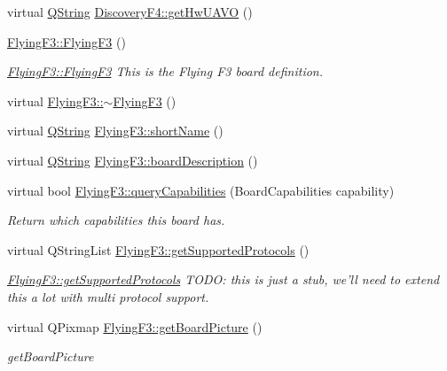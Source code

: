 \begin{DoxyCompactItemize}
virtual \hyperlink{group___u_a_v_objects_plugin_gab9d252f49c333c94a72f97ce3105a32d}{Q\-String} \hyperlink{group___boards___stm_gad4fb3147a8ceb8b1106048d7b44d92e9}{Discovery\-F4\-::get\-Hw\-U\-A\-V\-O} ()
\item 
\hyperlink{group___boards___stm_ga9b44241cce2e1f0737c9fef2eace273b}{Flying\-F3\-::\-Flying\-F3} ()
\begin{DoxyCompactList}\small\item\em \hyperlink{group___boards___stm_ga9b44241cce2e1f0737c9fef2eace273b}{Flying\-F3\-::\-Flying\-F3} This is the Flying F3 board definition. \end{DoxyCompactList}\item 
virtual \hyperlink{group___boards___stm_ga23437724f5332cc76950a41249c6d968}{Flying\-F3\-::$\sim$\-Flying\-F3} ()
\item 
virtual \hyperlink{group___u_a_v_objects_plugin_gab9d252f49c333c94a72f97ce3105a32d}{Q\-String} \hyperlink{group___boards___stm_ga968d0cdefdfe42c8f2dfbc4cafca72f2}{Flying\-F3\-::short\-Name} ()
\item 
virtual \hyperlink{group___u_a_v_objects_plugin_gab9d252f49c333c94a72f97ce3105a32d}{Q\-String} \hyperlink{group___boards___stm_ga76b7c5c83fb46e122a100ae0ef5fae8f}{Flying\-F3\-::board\-Description} ()
\item 
virtual bool \hyperlink{group___boards___stm_ga92cb3b23d790b1b3aadab14c830412f3}{Flying\-F3\-::query\-Capabilities} (Board\-Capabilities capability)
\begin{DoxyCompactList}\small\item\em Return which capabilities this board has. \end{DoxyCompactList}\item 
virtual Q\-String\-List \hyperlink{group___boards___stm_ga96db192be19ed6a7af49c8668cf4ff36}{Flying\-F3\-::get\-Supported\-Protocols} ()
\begin{DoxyCompactList}\small\item\em \hyperlink{group___boards___stm_ga96db192be19ed6a7af49c8668cf4ff36}{Flying\-F3\-::get\-Supported\-Protocols} T\-O\-D\-O\-: this is just a stub, we'll need to extend this a lot with multi protocol support. \end{DoxyCompactList}\item 
virtual Q\-Pixmap \hyperlink{group___boards___stm_ga7639046444dbf061bc2c2402d8ebc05e}{Flying\-F3\-::get\-Board\-Picture} ()
\begin{DoxyCompactList}\small\item\em get\-Board\-Picture \end{DoxyCompactList}\item 

\end{DoxyCompactItemize}

